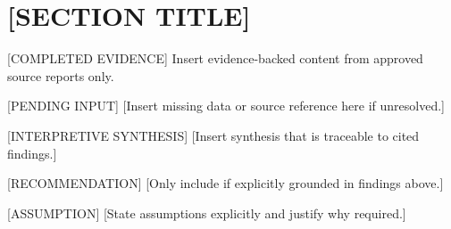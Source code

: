 \section{[SECTION TITLE]}

[COMPLETED EVIDENCE] Insert evidence-backed content from approved source reports only.

[PENDING INPUT] [Insert missing data or source reference here if unresolved.]

[INTERPRETIVE SYNTHESIS] [Insert synthesis that is traceable to cited findings.]

[RECOMMENDATION] [Only include if explicitly grounded in findings above.]

[ASSUMPTION] [State assumptions explicitly and justify why required.]
